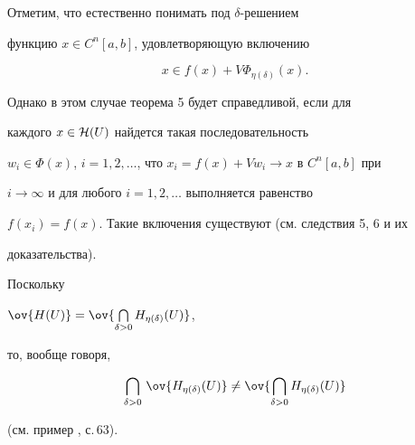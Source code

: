 \begin{note} Отметим, что естественно понимать под $\delta$-решением


функцию $x\in C^n[a,b]$, удовлетворяющую включению


$$


x\in f(x)+V\Phi_{\eta(\delta)}(x).


$$





Однако в этом случае теорема 5 будет справедливой, если для


каждого $x\in{\cal H}(U)$ найдется такая последовательность


$w_i\in\Phi(x)$, $i=1,2,\dotsc$, что $x_i=f(x)+Vw_i\to x$ в $C^n[a,b]$ при


$i\to\infty$ и для любого $i=1,2,\dotsc$ выполняется равенство


$f(x_i)=f(x)$. Такие включения существуют (см. следствия 5, 6 и их


доказательства).


\end{note}





\begin{note} Поскольку


$\ov{H(U)}=\ov{\bigcap\limits_{\delta>0}H_{\eta(\delta)}(U)}$,


то, вообще говоря,


$$


\bigcap_{\delta>0}\,\ov{H_{\eta(\delta)}(U)}\ne


\ov{\bigcap_{\delta>0}H_{\eta(\delta)}(U)}


$$


(см. пример \cite{4}, с.\,63).


\end{note}





